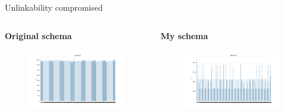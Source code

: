 \begin{frame}{Unlinkability compromised}
\begin{columns}
    \begin{column}{0.5\textwidth}
        \centering
        \vfill
        {\textbf{Original schema}}
        \vfill
        \begin{figure}
            \includegraphics[scale=0.3]{Images/res/origin_gamma2.png}
        \end{figure}
    \end{column} 
    \vrule
    \begin{column}{0.5\textwidth}
        \centering
        \vfill
        {\textbf{My schema}}
        \vfill
        \begin{figure}
            \includegraphics[scale=0.3]{Images/res/test_gamma2.png}
        \end{figure}
    \end{column}
\end{columns}
\end{frame}

